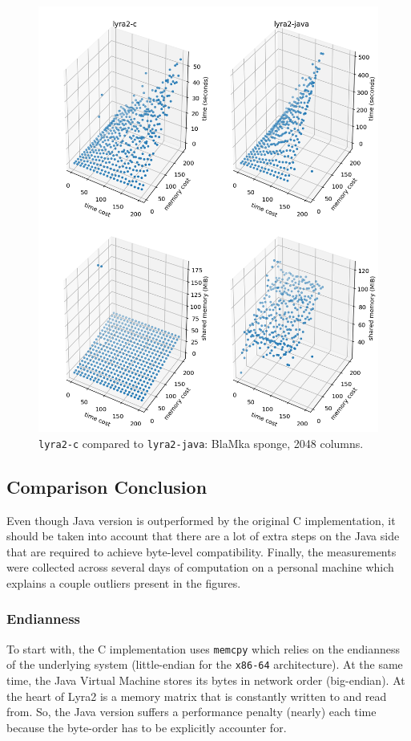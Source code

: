 \begin{figure}[H]
    \centering
    \includegraphics[width=\linewidth]{figures/tcost_mcost_blamka_2048}
    \caption{\texttt{lyra2-c} compared to \texttt{lyra2-java}: BlaMka sponge, 2048 columns.}
    \label{figure:tcost_mcost_blamka_2048}
\end{figure}

\subsection{Comparison Conclusion}

Even though Java version is outperformed by the original C implementation, it should be taken into account that there are a lot of extra steps on the Java side that are required to achieve byte-level compatibility. Finally, the measurements were collected across several days of computation on a personal machine which explains a couple outliers present in the figures.

\subsubsection{Endianness}
To start with, the C implementation uses \texttt{memcpy} which relies on the endianness of the underlying system (little-endian for the \texttt{x86-64} architecture). At the same time, the Java Virtual Machine stores its bytes in network order (big-endian). At the heart of Lyra2 is a memory matrix that is constantly written to and read from. So, the Java version suffers a performance penalty (nearly) each time because the byte-order has to be explicitly accounter for.

